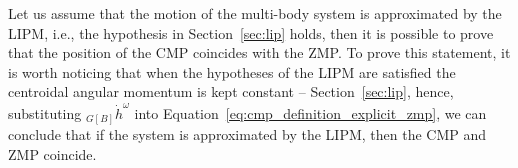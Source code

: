 Let us assume that the motion of the multi-body system is approximated by the LIPM, i.e., the hypothesis in Section~\ref{sec:lip} holds, then it is possible to prove that the position of the CMP coincides with the ZMP.
To prove this statement, it is worth noticing that when the hypotheses of the LIPM are satisfied the centroidal angular momentum is kept constant -- Section~\ref{sec:lip}, hence, substituting ${}_{G[B]} \dot{h}^\omega$ into Equation~\eqref{eq:cmp_definition_explicit_zmp}, we can conclude that if the system is approximated by the LIPM, then the CMP and ZMP coincide.
